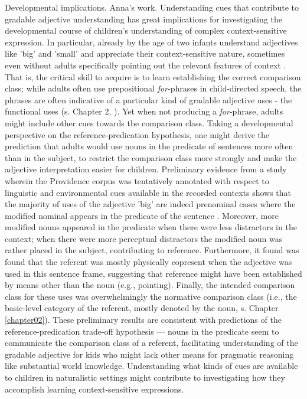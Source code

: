Developmental implications. Anna's work.
Understanding cues that contribute to gradable adjective understanding has great implications for investigating the developmental course of children's understanding of complex context-sensitive expression. In particular, already by the age of two infants understand adjectives like 'big' and 'small' and appreciate their context-sensitive nature, sometimes even without adults specifically pointing out the relevant features of context \parencite{Mintz2002, ebeling1994children}. That is, the critical skill to acquire is to learn establishing the correct comparison class; while adults often use prepositional \emph{for}-phrases in child-directed speech, the phrases are often indicative of a particular kind of gradable adjective uses - the functional uses (s. Chapter 2, \textcite{ebeling1994children}). Yet when not producing a \emph{for}-phrase, adults might include other cues towards tbe comparison class. Taking a developmental perspective on the reference-predication hypothesis, one might derive the prediction that adults would use nouns in the predicate of sentences more often than in the subject, to restrict the comparison class more strongly and make the adjective interpretation easier for children.  Preliminary evidence from a study wherein the Providence corpus was tentatively annotated with respect to linguistic and environmental cues available in the recorded contexts %
shows that the majority of uses of the adjective 'big' are indeed prenominal cases where the modified nominal appears in the predicate of the sentence \parencite{sinelnikova2020}. Moreover, more modified nouns appeared in the predicate when there were less distractors in the context; when there were more perceptual distractors the modified noun was rather placed in the subject, contributing to reference. Furthermore, it found was found that the referent was mostly physically copresent when the adjective was used in this sentence frame, suggesting that reference might have been established by means other than the noun (e.g., pointing). Finally, the intended comparison class for these uses was overwhelmingly the normative comparison class (i.e., the basic-level  category of the referent, mostly denoted by the noun, s. Chapter \ref{chapter02}). These preliminary results are consistent with predictions of the reference-predication trade-off hypothesis ---  nouns in the predicate seem to communicate the comparison class of a referent, facilitating understanding of the gradable adjective for kids who might lack other means for pragmatic reasoning like substantial world knowledge. 
Understanding what kinds of cues are available to children in naturalistic settings might contribute to investigating how they accomplish learning context-sensitive expressions.

